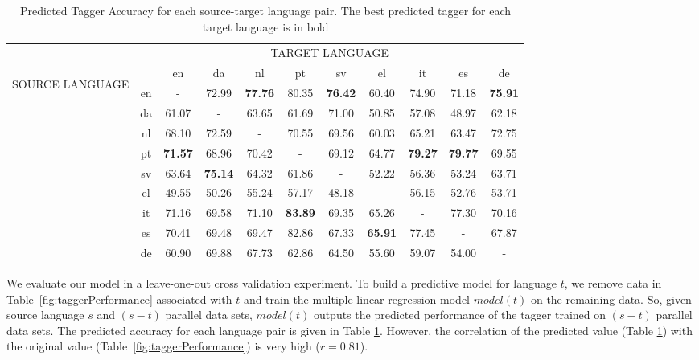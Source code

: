 \begin{table}
\centering
    \begin{tabular}{rcccccccccc}

          & \multicolumn{10}{c}{TARGET LANGUAGE} \\

    \multicolumn{1}{c}{\multirow{10}[0]{*}{	
    \begin{sideways}  
    SOURCE LANGUAGE
    \end{sideways}
}} &       & en    & da    & nl    & pt    & sv    & el    & it    & es    & de \\
    \multicolumn{1}{c}{} & en    & -     & 72.99 & \textbf{77.76} & 80.35 & \textbf{76.42} & 60.40 & 74.90 & 71.18 & \textbf{75.91} \\
    \multicolumn{1}{c}{} & da    & 61.07 & -     & 63.65 & 61.69 & 71.00 & 50.85 & 57.08 & 48.97 & 62.18 \\
    \multicolumn{1}{c}{} & nl    & 68.10 & 72.59 & -     & 70.55 & 69.56 & 60.03 & 65.21 & 63.47 & 72.75 \\
    \multicolumn{1}{c}{} & pt    & \textbf{71.57} & 68.96 & 70.42 & -     & 69.12 & 64.77 & \textbf{79.27} & \textbf{79.77} & 69.55 \\
    \multicolumn{1}{c}{} & sv    & 63.64 & \textbf{75.14} & 64.32 & 61.86 & -     & 52.22 & 56.36 & 53.24 & 63.71 \\
    \multicolumn{1}{c}{} & el    & 49.55 & 50.26 & 55.24 & 57.17 & 48.18 & -     & 56.15 & 52.76 & 53.71 \\
    \multicolumn{1}{c}{} & it    & 71.16 & 69.58 & 71.10 & \textbf{83.89} & 69.35 & 65.26 & -     & 77.30 & 70.16 \\
    \multicolumn{1}{c}{} & es    & 70.41 & 69.48 & 69.47 & 82.86 & 67.33 & \textbf{65.91} & 77.45 & -     & 67.87 \\
    \multicolumn{1}{c}{} & de    & 60.90 & 69.88 & 67.73 & 62.86 & 64.50 & 55.60 & 59.07 & 54.00 & - \\

    \end{tabular}%

\caption{Predicted Tagger Accuracy for each source-target language pair. The best predicted tagger for each target language is in bold }
\label{fig:taggerPerformancePredicted}
\end{table}

We evaluate our model in a leave-one-out cross validation experiment. To build a predictive model for language $t$, we remove data in Table~\ref{fig:taggerPerformance} associated with $t$ and train the multiple linear regression model $model(t)$ on the remaining data. So, given source language $s$ and $(s-t)$ parallel data sets, $model(t)$ outputs the predicted performance of the tagger trained on $(s-t)$ parallel data sets. The predicted accuracy for each language pair is given in Table \ref{fig:taggerPerformancePredicted}. However, the correlation of the predicted value (Table \ref{fig:taggerPerformancePredicted}) with the original value (Table~\ref{fig:taggerPerformance}) is very high ($r=0.81$). 

